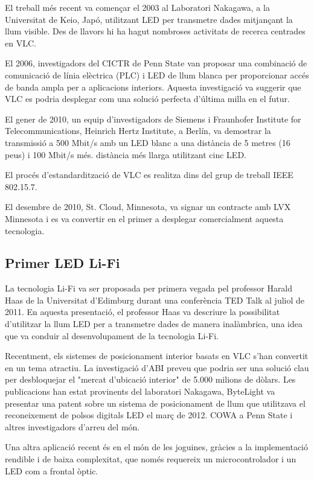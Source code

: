 El treball més recent va començar el 2003 al Laboratori Nakagawa, a la Universitat de Keio, Japó, utilitzant LED per transmetre dades mitjançant la llum visible. Des de llavors hi ha hagut nombroses activitats de recerca centrades en VLC.

El 2006, investigadors del CICTR de Penn State van proposar una combinació de comunicació de línia elèctrica (PLC) i LED de llum blanca per proporcionar accés de banda ampla per a aplicacions interiors. Aquesta investigació va suggerir que VLC es podria desplegar com una solució perfecta d'última milla en el futur.

El gener de 2010, un equip d'investigadors de Siemens i Fraunhofer Institute for Telecommunications, Heinrich Hertz Institute, a Berlín, va demostrar la transmissió a 500 Mbit/s amb un LED blanc a una distància de 5 metres (16 peus) i 100 Mbit/s més. distància més llarga utilitzant cinc LED.

El procés d'estandardització de VLC es realitza dins del grup de treball IEEE 802.15.7.

El desembre de 2010, St. Cloud, Minnesota, va signar un contracte amb LVX Minnesota i es va convertir en el primer a desplegar comercialment aquesta tecnologia.


\subsection*{Primer LED Li-Fi}

La tecnologia Li-Fi va ser proposada per primera vegada pel professor Harald Haas de la Universitat d'Edimburg durant una conferència TED Talk al juliol de 2011. En aquesta presentació, el professor Haas va descriure la possibilitat d'utilitzar la llum LED per a transmetre dades de manera inalàmbrica, una idea que va conduir al desenvolupament de la tecnologia Li-Fi.

Recentment, els sistemes de posicionament interior basats en VLC s'han convertit en un tema atractiu. La investigació d'ABI preveu que podria ser una solució clau per desbloquejar el "mercat d'ubicació interior" de 5.000 milions de dòlars. Les publicacions han estat provinents del laboratori Nakagawa, ByteLight va presentar una patent sobre un sistema de posicionament de llum que utilitzava el reconeixement de polsos digitals LED el març de 2012. COWA a Penn State i altres investigadors d'arreu del món.

Una altra aplicació recent és en el món de les joguines, gràcies a la implementació rendible i de baixa complexitat, que només requereix un microcontrolador i un LED com a frontal òptic.


